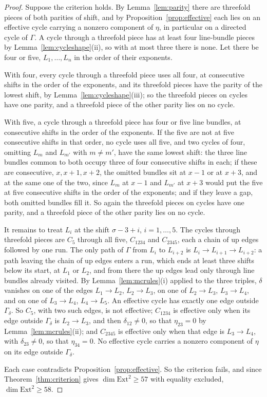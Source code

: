 \documentclass[11pt,reqno]{amsart}
\numberwithin{equation}{section}
\theoremstyle{plain}
\theoremstyle{definition}
\newcommand{\Ext}{\mathrm{Ext}}
\begin{document}
\begin{proof}
Suppose the criterion holds. By Lemma~\ref{lem:parity} there are threefold pieces of both parities of shift, and by Proposition~\ref{prop:effective} each lies on an effective cycle carrying a nonzero component of $\eta$, in particular on a directed cycle of $\Gamma$. A cycle through a threefold piece has at least four line-bundle pieces by Lemma~\ref{lem:cycleshape}(ii), so with at most three there is none. Let there be four or five, $L_{1},\dots,L_{n}$ in the order of their exponents.

With four, every cycle through a threefold piece uses all four, at consecutive shifts in the order of the exponents, and its threefold pieces have the parity of the lowest shift, by Lemma~\ref{lem:cycleshape}(iii); so the threefold pieces on cycles have one parity, and a threefold piece of the other parity lies on no cycle.

With five, a cycle through a threefold piece has four or five line bundles, at consecutive shifts in the order of the exponents. If the five are not at five consecutive shifts in that order, no cycle uses all five, and two cycles of four, omitting $L_{m}$ and $L_{m'}$ with $m\ne m'$, have the same lowest shift: the three line bundles common to both occupy three of four consecutive shifts in each; if these are consecutive, $x,x+1,x+2$, the omitted bundles sit at $x-1$ or at $x+3$, and at the same one of the two, since $L_{m}$ at $x-1$ and $L_{m'}$ at $x+3$ would put the five at five consecutive shifts in the order of the exponents; and if they leave a gap, both omitted bundles fill it. So again the threefold pieces on cycles have one parity, and a threefold piece of the other parity lies on no cycle.

It remains to treat $L_{i}$ at the shift $\sigma-3+i$, $i=1,\dots,5$. The cycles through threefold pieces are $C_{5}$ through all five, $C_{1234}$ and $C_{2345}$, each a chain of up edges followed by one run. The only path of $\Gamma$ from $L_{i}$ to $L_{i+2}$ is $L_{i}\to L_{i+1}\to L_{i+2}$: a path leaving the chain of up edges enters a run, which ends at least three shifts below its start, at $L_{1}$ or $L_{2}$, and from there the up edges lead only through line bundles already visited. By Lemma~\ref{lem:mcrules}(i) applied to the three triples, $\delta$ vanishes on one of the edges $L_{1}\to L_{2}$, $L_{2}\to L_{3}$, on one of $L_{2}\to L_{3}$, $L_{3}\to L_{4}$, and on one of $L_{3}\to L_{4}$, $L_{4}\to L_{5}$. An effective cycle has exactly one edge outside $\Gamma_{\delta}$. So $C_{5}$, with two such edges, is not effective; $C_{1234}$ is effective only when its edge outside $\Gamma_{\delta}$ is $L_{2}\to L_{3}$, and then $\delta_{12}\ne0$, so that $\eta_{23}=0$ by Lemma~\ref{lem:mcrules}(ii); and $C_{2345}$ is effective only when that edge is $L_{3}\to L_{4}$, with $\delta_{23}\ne0$, so that $\eta_{34}=0$. No effective cycle carries a nonzero component of $\eta$ on its edge outside $\Gamma_{\delta}$.

Each case contradicts Proposition~\ref{prop:effective}. So the criterion fails, and since Theorem~\ref{thm:criterion} gives $\dim\Ext^{2}\ge57$ with equality excluded, $\dim\Ext^{2}\ge58$.
\end{proof}
\end{document}
